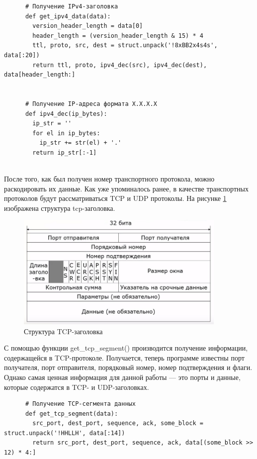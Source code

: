 \documentclass[bachelor, och, coursework]{SCWorks}
\begin{document}
    \begin{verbatim}
      # Получение IPv4-заголовка
      def get_ipv4_data(data):
        version_header_length = data[0]
        header_length = (version_header_length & 15) * 4
        ttl, proto, src, dest = struct.unpack('!8xBB2x4s4s', data[:20])
        return ttl, proto, ipv4_dec(src), ipv4_dec(dest), data[header_length:]
      
      
      # Получение IP-адреса формата X.X.X.X
      def ipv4_dec(ip_bytes):
        ip_str = ''
        for el in ip_bytes:
          ip_str += str(el) + '.'
        return ip_str[:-1]
      
    \end{verbatim}

    После того, как был получен номер транспортного протокола, можно раскодировать их данные. Как уже упоминалось ранее, в качестве транспортных протоколов
    будут рассматриваться TCP и UDP протоколы. На рисунке \ref{tcp-header} изображена структура tcp-заголовка.
  
    \begin{figure}[H]
      \centering
      \includegraphics[width=0.9\textwidth]{photo/tcp-segment.jpg}
      \caption{Структура TCP-заголовка}
      \label{tcp-header}
    \end{figure}
    
    С помощью функции get\_tcp\_segment() производится получение информации, содержащейся в TCP-протоколе. Получается, теперь программе известны порт получателя,
    порт отправителя, порядковый номер, номер подтверждения и флаги. Однако самая ценная информация для данной работы --- это порты и данные, которые
    содержатся в TCP- и UDP-заголовках.

    \begin{verbatim}
      # Получение TCP-cегмента данных
      def get_tcp_segment(data):
        src_port, dest_port, sequence, ack, some_block = struct.unpack('!HHLLH', data[:14])
        return src_port, dest_port, sequence, ack, data[(some_block >> 12) * 4:]
    
    \end{verbatim}
\end{document}
